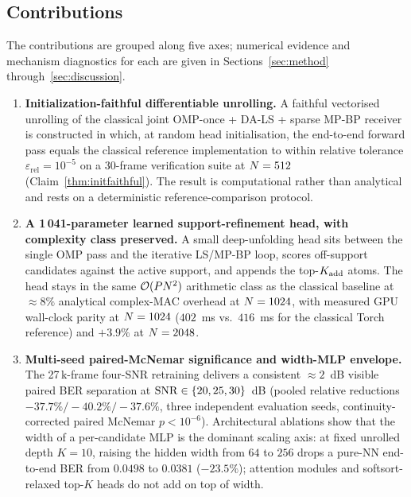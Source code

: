 \subsection{Contributions}
\label{ssec:contrib}

The contributions are grouped along five axes; numerical evidence and
mechanism diagnostics for each are given in Sections~\ref{sec:method}
through~\ref{sec:discussion}.

\begin{enumerate}[leftmargin=1.3em,itemsep=2pt]
\item \textbf{Initialization-faithful differentiable unrolling.} A faithful
vectorised unrolling of the classical joint OMP-once + DA-LS +
sparse MP-BP receiver is constructed in which, at random head
initialisation, the end-to-end forward pass equals the classical
reference implementation to within relative tolerance $\varepsilon_\text{rel}=10^{-5}$
on a 30-frame verification suite at $N=512$
(Claim~\ref{thm:initfaithful}). The result is computational rather than
analytical and rests on a deterministic reference-comparison protocol.

\item \textbf{A 1\,041-parameter learned support-refinement head, with
complexity class preserved.} A small deep-unfolding head sits between the
single OMP pass and the iterative LS/MP-BP loop, scores off-support
candidates against the active support, and appends the top-$K_{\mathrm{add}}$ atoms.
The head stays in the same $\mathcal{O}(PN^2)$ arithmetic class
as the classical baseline at $\approx 8\%$ analytical complex-MAC
overhead at $N=1024$, with measured GPU wall-clock parity at
$N=1024$ ($402$~ms vs.\ $416$~ms for the classical Torch reference)
and $+3.9\%$ at $N=2048$.

\item \textbf{Multi-seed paired-McNemar significance and width-MLP envelope.}
The 27\,k-frame four-SNR retraining delivers a consistent
$\approx 2$~dB visible paired BER separation at $\mathrm{SNR}\in\{20,25,30\}$~dB
(pooled relative reductions $-37.7\%/-40.2\%/-37.6\%$, three independent
evaluation seeds, continuity-corrected paired McNemar $p<10^{-6}$).
Architectural ablations show that the width of a per-candidate MLP is the
dominant scaling axis: at fixed unrolled depth $K=10$, raising the hidden
width from $64$ to $256$ drops a pure-NN end-to-end BER from $0.0498$ to
$0.0381$ ($-23.5\%$); attention modules and softsort-relaxed top-$K$
heads do not add on top of width.


\end{enumerate}
